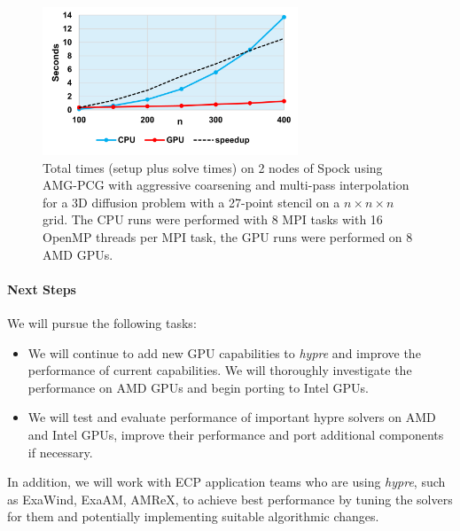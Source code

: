 \begin{figure}[bth]
\centering
	\includegraphics[width=3in]{projects/2.3.3-MathLibs/2.3.3.12-SUNDIALS-hypre/spock-AMG-PCG.png}
	\caption{\label{fig:Spock-AMG} Total times (setup plus solve times) on 2 nodes of Spock using AMG-PCG with aggressive coarsening and multi-pass interpolation for a 3D diffusion problem with a 27-point stencil on a $n \times n \times n$ grid. The CPU runs were performed with 8 MPI tasks with 16 OpenMP threads per MPI task, the GPU runs were performed on 8 AMD GPUs.}

\end{figure}

\paragraph{Next Steps}

We will pursue the following tasks:

\begin{itemize}
\item We will continue to add new GPU capabilities to {\sl hypre} and improve the performance of current capabilities. We will thoroughly investigate the performance on AMD GPUs and begin porting to Intel GPUs.
\item We will test and evaluate performance of important hypre solvers on AMD and Intel GPUs, improve their performance and port additional components if necessary.
\end{itemize}
In addition, we will work with ECP application teams who are using {\sl hypre}, such as ExaWind, ExaAM, AMReX,  to achieve best performance by tuning the solvers for them and potentially implementing suitable algorithmic changes.

